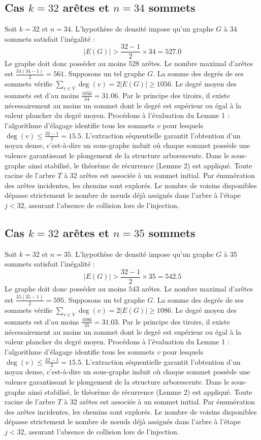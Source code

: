 \documentclass[12pt,a4paper]{article}
\begin{document}
\subsection{Cas $k = 32$ arêtes et $n = 34$ sommets}
Soit $k = 32$ et $n = 34$. L'hypothèse de densité impose qu'un graphe $G$ à 34 sommets satisfait l'inégalité :
$$ |E(G)| > \frac{32-1}{2} \times 34 = 527.0 $$
Le graphe doit donc posséder au moins $528$ arêtes. Le nombre maximal d'arêtes est $\frac{34(34-1)}{2} = 561$.
Supposons un tel graphe $G$. La somme des degrés de ses sommets vérifie $\sum_{v \in V} \deg(v) = 2|E(G)| \geq 1056$.
Le degré moyen des sommets est d'au moins $\frac{1056}{34} = 31.06$.
Par le principe des tiroirs, il existe nécessairement au moins un sommet dont le degré est supérieur ou égal à la valeur plancher du degré moyen.
Procédons à l'évaluation du Lemme 1 : l'algorithme d'élagage identifie tous les sommets $v$ pour lesquels $\deg(v) \leq \frac{32-1}{2} = 15.5$.
L'extraction séquentielle garantit l'obtention d'un noyau dense, c'est-à-dire un sous-graphe induit où chaque sommet possède une valence garantissant le plongement de la structure arborescente.
Dans le sous-graphe ainsi stabilisé, le théorème de récurrence (Lemme 2) est appliqué. Toute racine de l'arbre $T$ à 32 arêtes est associée à un sommet initial. Par énumération des arêtes incidentes, les chemins sont explorés. Le nombre de voisins disponibles dépasse strictement le nombre de nœuds déjà assignés dans l'arbre à l'étape $j < 32$, assurant l'absence de collision lors de l'injection.

\subsection{Cas $k = 32$ arêtes et $n = 35$ sommets}
Soit $k = 32$ et $n = 35$. L'hypothèse de densité impose qu'un graphe $G$ à 35 sommets satisfait l'inégalité :
$$ |E(G)| > \frac{32-1}{2} \times 35 = 542.5 $$
Le graphe doit donc posséder au moins $543$ arêtes. Le nombre maximal d'arêtes est $\frac{35(35-1)}{2} = 595$.
Supposons un tel graphe $G$. La somme des degrés de ses sommets vérifie $\sum_{v \in V} \deg(v) = 2|E(G)| \geq 1086$.
Le degré moyen des sommets est d'au moins $\frac{1086}{35} = 31.03$.
Par le principe des tiroirs, il existe nécessairement au moins un sommet dont le degré est supérieur ou égal à la valeur plancher du degré moyen.
Procédons à l'évaluation du Lemme 1 : l'algorithme d'élagage identifie tous les sommets $v$ pour lesquels $\deg(v) \leq \frac{32-1}{2} = 15.5$.
L'extraction séquentielle garantit l'obtention d'un noyau dense, c'est-à-dire un sous-graphe induit où chaque sommet possède une valence garantissant le plongement de la structure arborescente.
Dans le sous-graphe ainsi stabilisé, le théorème de récurrence (Lemme 2) est appliqué. Toute racine de l'arbre $T$ à 32 arêtes est associée à un sommet initial. Par énumération des arêtes incidentes, les chemins sont explorés. Le nombre de voisins disponibles dépasse strictement le nombre de nœuds déjà assignés dans l'arbre à l'étape $j < 32$, assurant l'absence de collision lors de l'injection.
\end{document}
